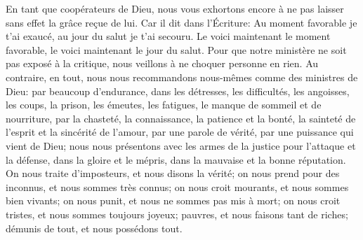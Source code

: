En tant que coopérateurs de Dieu,
	nous vous exhortons encore
		à ne pas laisser sans effet la grâce reçue de lui.
Car il dit dans l’Écriture:
	Au moment favorable je t’ai exaucé, au jour du salut je t’ai secouru.
Le voici maintenant le moment favorable, le voici maintenant le jour du salut.
Pour que notre ministère ne soit pas exposé à la critique,
	nous veillons à ne choquer personne en rien.
Au contraire, en tout, nous nous recommandons nous-mêmes
		comme des ministres de Dieu:
	par beaucoup d’endurance, dans les détresses, les difficultés,
	les angoisses, les coups, la prison, les émeutes,
	les fatigues, le manque de sommeil et de nourriture,
	par la chasteté, la connaissance, la patience et la bonté,
		la sainteté de l’esprit et la sincérité de l’amour,
	par une parole de vérité, par une puissance qui vient de Dieu;
	nous nous présentons avec les armes de la justice
		pour l’attaque et la défense,
	dans la gloire et le mépris, dans la mauvaise et la bonne réputation.
On nous traite d’imposteurs, et nous disons la vérité;
	on nous prend pour des inconnus, et nous sommes très connus;
	on nous croit mourants, et nous sommes bien vivants;
	on nous punit, et nous ne sommes pas mis à mort;
	on nous croit tristes, et nous sommes toujours joyeux;
	pauvres, et nous faisons tant de riches;
	démunis de tout, et nous possédons tout.
